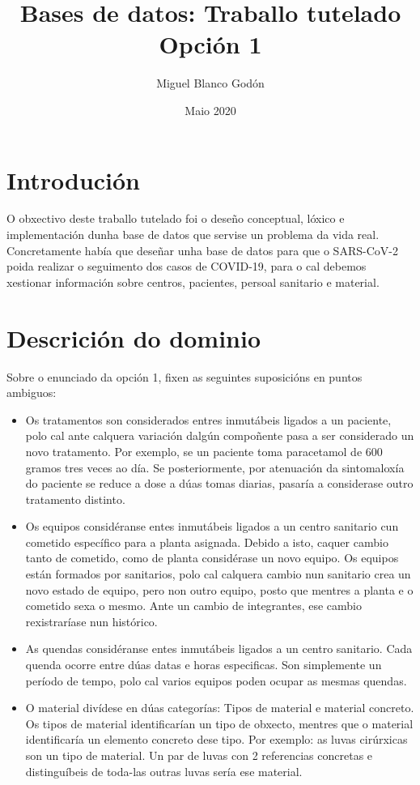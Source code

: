 \documentclass{article}
\begin{document}
\title{Bases de datos: Traballo tutelado
\newline
Opción 1}
\author{Miguel Blanco Godón}
\date{Maio 2020}
\maketitle

\section{Introdución}
O obxectivo deste traballo tutelado foi o deseño conceptual, lóxico e implementación dunha base de datos que servise un problema da vida real. Concretamente había que deseñar unha base de datos para que o SARS-CoV-2 poida realizar o seguimento dos casos de COVID-19, para o cal debemos xestionar información sobre centros, pacientes, persoal sanitario e material.
\section{Descrición do dominio}
Sobre o enunciado da opción 1, fixen as seguintes suposicións en puntos ambiguos:
\begin{itemize}
	\item Os tratamentos son considerados entres inmutábeis ligados a un paciente, polo cal ante calquera variación dalgún compoñente pasa a ser considerado un novo tratamento. Por exemplo, se un paciente toma paracetamol de 600 gramos tres veces ao día. Se posteriormente, por atenuación da sintomaloxía do paciente se reduce a dose a dúas tomas diarias, pasaría a considerase outro tratamento distinto.
	\item Os equipos considéranse entes inmutábeis ligados a un centro sanitario cun cometido específico para a planta asignada. Debido a isto, caquer cambio tanto de cometido, como de planta considérase un novo equipo. Os equipos están formados por sanitarios, polo cal calquera cambio nun sanitario crea un novo estado de equipo, pero non outro equipo, posto que mentres a planta e o cometido sexa o mesmo. Ante un cambio de integrantes, ese cambio rexistraríase nun histórico.
	\item As quendas considéranse entes inmutábeis ligados a un centro sanitario. Cada quenda ocorre entre dúas datas e horas especificas. Son simplemente un período de tempo, polo cal varios equipos poden ocupar as mesmas quendas.
	\item O material divídese en dúas categorías: Tipos de material e material concreto. Os tipos de material identificarían un tipo de obxecto, mentres que o material identificaría un elemento concreto dese tipo. Por exemplo: as luvas cirúrxicas son un tipo de material. Un par de luvas con 2 referencias concretas e distinguíbeis de toda-las outras luvas sería ese material.
\end{itemize}
\end{document}
